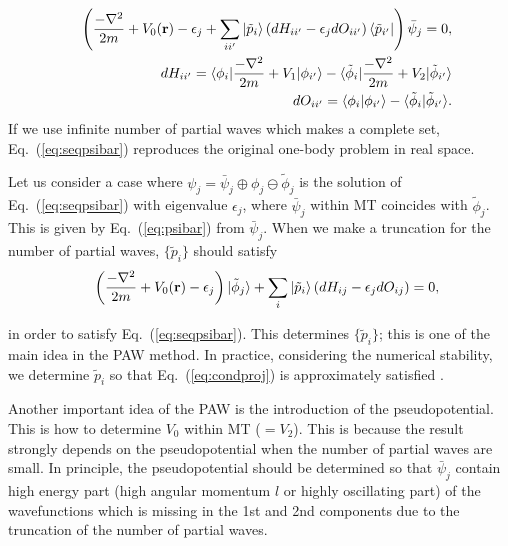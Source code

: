 \documentclass[twocolumn,showpacs,preprintnumbers,amsmath,amssymb,floatfix]{revtex4-1}
\newcommand{\bfr}{{\bf r}}
\def\tphi{{\tilde{\phi}}}
\newcommand{\req}[1]{\mbox{Eq.~\!(\ref{#1})}}
\begin{document}
\begin{widetext}
\begin{eqnarray}
&&\left( \frac{-\nabla^2}{2m}+V_0(\bfr)-\epsilon_j +
 \sum_{ii'}  
  |\tilde{p}_i \rangle  
   \left(dH_{ii'}-\epsilon_j dO_{ii'} \right)  
  \langle \tilde{p}_{i'}| 
\right) \bar{\psi}_j=0, \label{eq:seqpsibar}\\
&&dH_{ii'}= \langle \phi_i| \frac{-\nabla^2}{2m}+V_1|\phi_{i'}\rangle  
 -  \langle \tphi_i| \frac{-\nabla^2}{2m}+V_2|\tphi_{i'}\rangle \\
&&dO_{ii'}= \langle \phi_i|\phi_{i'}\rangle  
 -  \langle \tphi_i| \tphi_{i'}\rangle.
\end{eqnarray}
If we use infinite number of partial waves which makes a complete set, 
\req{eq:seqpsibar} reproduces the original one-body problem in real space.

Let us consider a case where
$\psi_j=\bar{\psi}_j \oplus \phi_j\ominus\tphi_j$
is the solution of \req{eq:seqpsibar} with eigenvalue $\epsilon_j$,
where $\bar{\psi}_j$ within MT coincides with $\tphi_j$.
This is given by \req{eq:psibar} from $\bar{\psi}_j$.
When we make a truncation for the number of partial waves,
$\{\tilde{p}_i\}$ should satisfy 
\begin{eqnarray}
&& \left( \frac{-\nabla^2}{2m}+V_0(\bfr)-\epsilon_j \right)|\tphi_j \rangle
 + \sum_i |\tilde{p}_i \rangle  
   \left(dH_{ij}-\epsilon_j dO_{ij} \right)  =0, \label{eq:condproj}
\end{eqnarray}
\end{widetext}
in order to satisfy \req{eq:seqpsibar}.
This determines $\{\tilde{p}_i\}$; this is one of the main idea in the PAW method. 
In practice, considering the numerical stability, 
we determine  $\tilde{p}_i$ so that \req{eq:condproj} is approximately
satisfied \cite{PAW}. 

Another important idea of the PAW is the introduction of the
pseudopotential. This is how to determine $V_0$ within MT ($=V_2$).
This is because the result strongly depends on the pseudopotential
when the number of partial waves are small. In principle, the pseudopotential 
should be determined so that $\bar{\psi}_j$ contain high energy part 
(high angular momentum $l$ or highly oscillating part) of the wavefunctions
which is missing in the 1st and 2nd components due to the 
truncation of the number of partial waves.
\end{document}
